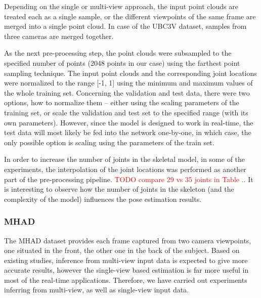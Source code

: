Depending on the single or multi-view approach, the input point clouds are treated each as a single sample, or the different viewpoints of the same frame are merged into a single point cloud. In case of the UBC3V dataset, samples from three cameras are merged together. %
\par
\vspace{5mm}
\noindent
As the next pre-processing step, the point clouds were subsampled to the specified number of points (2048 points in our case) using the farthest point sampling technique. The input point clouds and the corresponding joint locations were normalized to the range [-1, 1] using the minimum and maximum values of the whole training set. Concerning the validation and test data, there were two options, how to normalize them – either using the scaling parameters of the training set, or scale the validation and test set to the specified range (with its own parameters). However, since the model is designed to work in real-time, the test data will most likely be fed into the network one-by-one, in which case, the only possible option is scaling using the parameters of the train set.\par
\vspace{5mm}
\noindent
In order to increase the number of joints in the skeletal model, in some of the experiments, the interpolation of the joint locations was performed as another part of the pre-processing pipeline.  \textcolor{red}{TODO compare 29 vs 35 joints in Table ..} It is interesting to observe how the number of joints in the skeleton (and the complexity of the model) influences the pose estimation results.

\subsubsection{MHAD}
The MHAD dataset provides each frame captured from two camera viewpoints, one situated in the front, the other one in the back of the subject.
Based on existing studies, inference from multi-view input data is expected to give more accurate results, however the single-view based estimation is far more useful in most of the real-time applications. Therefore, we have carried out experiments inferring from multi-view, as well as single-view input data.\par
\vspace{5mm}

